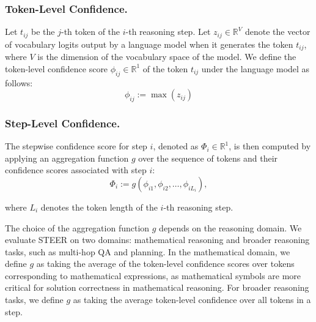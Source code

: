 \documentclass[letterpaper]{article} %
\begin{document}
\subsubsection{Token-Level Confidence.}
Let $t_{ij}$ be the $j$-th token of the $i$-th reasoning step. Let $z_{ij} \in \mathbb{R}^V$ denote the vector of vocabulary logits output by a language model when it generates the token $t_{ij}$, where $V$ is the dimension of the vocabulary space of the model. We define the token-level confidence score $\phi_{ij} \in \mathbb{R}^1$ of the token $t_{ij}$ under the language model as follows:
\begin{equation}    
    \phi_{ij} := \max(z_{ij})
\end{equation}
\subsubsection{Step-Level Confidence.}
The stepwise confidence score for step $i$, denoted as $\Phi_i\in \mathbb{R}^1$, is then computed by applying an aggregation function $g$ over the sequence of tokens and their confidence scores associated with step $i$:
\begin{equation}
    \Phi_i := g\left( \phi_{i1}, \phi_{i2}, \dots, \phi_{i{L_i}}\right),
\end{equation}

\noindent where $L_i$ denotes the token length of the $i$-th reasoning step.

The choice of the aggregation function $g$ depends on the reasoning domain. We evaluate STEER on two domains: mathematical reasoning and broader reasoning tasks, such as multi-hop QA and planning. 
In the mathematical domain, we define $g$ as taking the average of the token-level confidence scores over tokens corresponding to mathematical expressions, as mathematical symbols are more critical for solution correctness \citep{lincritical} in mathematical reasoning.
For broader reasoning tasks, we define $g$ as taking the average token-level confidence over all tokens in a step.



\end{document}
